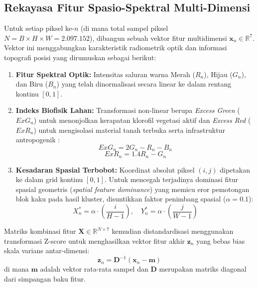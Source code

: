 \documentclass[11pt,twoside]{article}
\begin{document}
\subsection{Rekayasa Fitur Spasio-Spektral Multi-Dimensi}
Untuk setiap piksel ke-$n$ (di mana total sampel piksel $N = B \times H \times W = 2.097.152$), dibangun sebuah vektor fitur multidimensi $\mathbf{x}_n \in \mathbb{R}^7$. Vektor ini menggabungkan karakteristik radiometrik optik dan informasi topografi posisi yang dirumuskan sebagai berikut:
\begin{enumerate}
    \item \textbf{Fitur Spektral Optik:} Intensitas saluran warna Merah ($R_n$), Hijau ($G_n$), dan Biru ($B_n$) yang telah dinormalisasi secara linear ke dalam rentang kontinu $[0, 1]$.
    \item \textbf{Indeks Biofisik Lahan:} Transformasi non-linear berupa \textit{Excess Green} ($ExG_n$) untuk menonjolkan kerapatan klorofil vegetasi aktif dan \textit{Excess Red} ($ExR_n$) untuk mengisolasi material tanah terbuka serta infrastruktur antropogenik \cite{woebbecke1995color}:
    \begin{equation}
        ExG_n = 2G_n - R_n - B_n
    \end{equation}
    \begin{equation}
        ExR_n = 1.4R_n - G_n
    \end{equation}
    \item \textbf{Kesadaran Spasial Terbobot:} Koordinat absolut piksel $(i, j)$ dipetakan ke dalam grid kontinu $[0, 1]$. Untuk mencegah terjadinya dominasi fitur spasial geometris (\textit{spatial feature dominance}) yang memicu eror pemotongan blok kaku pada hasil kluster, disuntikkan faktor penimbang spasial ($\alpha = 0.1$):
    \begin{equation}
        X_n^* = \alpha \cdot \left(\frac{i}{H-1}\right), \quad Y_n^* = \alpha \cdot \left(\frac{j}{W-1}\right)
    \end{equation}
\end{enumerate}

Matriks kombinasi fitur $\mathbf{X} \in \mathbb{R}^{N \times 7}$ kemudian distandardisasi menggunakan transformasi Z-score untuk menghasilkan vektor fitur akhir $\mathbf{z}_n$ yang bebas bias skala varians antar-dimensi:
\begin{equation}
    \mathbf{z}_n = \mathbf{D}^{-1}(\mathbf{x}_n - \mathbf{m})
\end{equation}
di mana $\mathbf{m}$ adalah vektor rata-rata sampel dan $\mathbf{D}$ merupakan matriks diagonal dari simpangan baku fitur.
\end{document}
